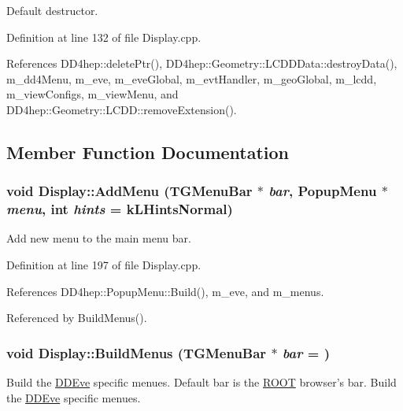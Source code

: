 Default destructor. 

Definition at line 132 of file Display.cpp.

References DD4hep::deletePtr(), DD4hep::Geometry::LCDDData::destroyData(), m\_\-dd4Menu, m\_\-eve, m\_\-eveGlobal, m\_\-evtHandler, m\_\-geoGlobal, m\_\-lcdd, m\_\-viewConfigs, m\_\-viewMenu, and DD4hep::Geometry::LCDD::removeExtension().

\subsection{Member Function Documentation}
\hypertarget{class_d_d4hep_1_1_display_ac2ef8ca2957cd39ad268c7536edb6757}{
\subsubsection[{AddMenu}]{\setlength{\rightskip}{0pt plus 5cm}void Display::AddMenu (TGMenuBar $\ast$ {\em bar}, \/  {\bf PopupMenu} $\ast$ {\em menu}, \/  int {\em hints} = {\ttfamily kLHintsNormal})}}
\label{class_d_d4hep_1_1_display_ac2ef8ca2957cd39ad268c7536edb6757}


Add new menu to the main menu bar. 

Definition at line 197 of file Display.cpp.

References DD4hep::PopupMenu::Build(), m\_\-eve, and m\_\-menus.

Referenced by BuildMenus().\hypertarget{class_d_d4hep_1_1_display_a9b8dbd9769ea14b3489b481ae3361080}{
\subsubsection[{BuildMenus}]{\setlength{\rightskip}{0pt plus 5cm}void Display::BuildMenus (TGMenuBar $\ast$ {\em bar} = {})}}
\label{class_d_d4hep_1_1_display_a9b8dbd9769ea14b3489b481ae3361080}


Build the \hyperlink{struct_d_d4hep_1_1_d_d_eve}{DDEve} specific menues. Default bar is the \hyperlink{namespace_r_o_o_t}{ROOT} browser's bar. Build the \hyperlink{struct_d_d4hep_1_1_d_d_eve}{DDEve} specific menues. 

